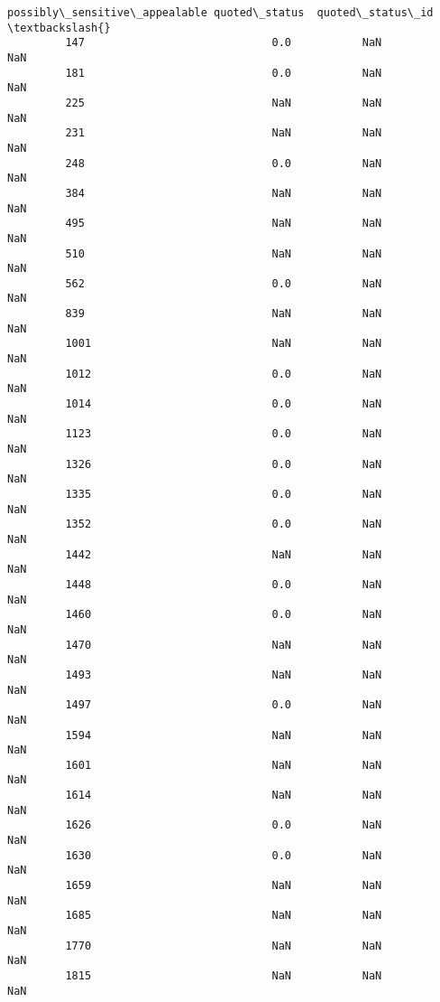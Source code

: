 \documentclass[11pt]{article}
\begin{document}
\begin{Verbatim}[commandchars=\\\{\}]
               possibly\_sensitive\_appealable quoted\_status  quoted\_status\_id  \textbackslash{}
         147                             0.0           NaN               NaN   
         181                             0.0           NaN               NaN   
         225                             NaN           NaN               NaN   
         231                             NaN           NaN               NaN   
         248                             0.0           NaN               NaN   
         384                             NaN           NaN               NaN   
         495                             NaN           NaN               NaN   
         510                             NaN           NaN               NaN   
         562                             0.0           NaN               NaN   
         839                             NaN           NaN               NaN   
         1001                            NaN           NaN               NaN   
         1012                            0.0           NaN               NaN   
         1014                            0.0           NaN               NaN   
         1123                            0.0           NaN               NaN   
         1326                            0.0           NaN               NaN   
         1335                            0.0           NaN               NaN   
         1352                            0.0           NaN               NaN   
         1442                            NaN           NaN               NaN   
         1448                            0.0           NaN               NaN   
         1460                            0.0           NaN               NaN   
         1470                            NaN           NaN               NaN   
         1493                            NaN           NaN               NaN   
         1497                            0.0           NaN               NaN   
         1594                            NaN           NaN               NaN   
         1601                            NaN           NaN               NaN   
         1614                            NaN           NaN               NaN   
         1626                            0.0           NaN               NaN   
         1630                            0.0           NaN               NaN   
         1659                            NaN           NaN               NaN   
         1685                            NaN           NaN               NaN   
         1770                            NaN           NaN               NaN   
         1815                            NaN           NaN               NaN   

\end{Verbatim}
\end{document}
